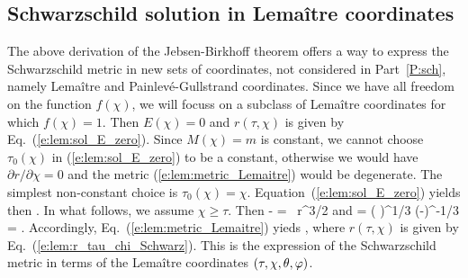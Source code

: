 \subsection{Schwarzschild solution in Lemaître coordinates} \label{s:lem:Schwarzschild}

The above derivation of the Jebsen-Birkhoff theorem offers a way to express
the Schwarzschild metric in new sets of coordinates, not considered in Part~\ref{P:sch},
namely Lemaître and Painlevé-Gullstrand coordinates.
Since we have all freedom on the function $f(\chi)$, we will focuss on a subclass
of Lemaître coordinates for which $f(\chi)=1$.
Then $E(\chi)=0$ and $r(\tau,\chi)$
is given by Eq.~(\ref{e:lem:sol_E_zero}). Since $M(\chi)=m$ is constant, we
cannot choose $\tau_0(\chi)$ in (\ref{e:lem:sol_E_zero}) to be a constant, otherwise we would have
$\partial r/\partial \chi=0$ and the metric
(\ref{e:lem:metric_Lemaitre}) would be degenerate.
The simplest non-constant choice is
$\tau_0(\chi) = \chi$.
Equation~(\ref{e:lem:sol_E_zero}) yields then
\be \label{e:lem:r_tau_chi_Schwarz}
    .
\ee
In what follows, we assume $\chi\geq\tau$. Then
\be \label{e:lem:chi_tau_r_Schwarz}
    \chi - \tau =  \,  r^{3/2}
\ee
and
\be \label{e:lem:drdchi_Schwarz}
     = \left(  \right)^{1/3} (\chi-\tau)^{-1/3}
        =  .
\ee
Accordingly, Eq.~(\ref{e:lem:metric_Lemaitre}) yieds
\be \label{e:lem:Sch_met_Lem}
     ,
\ee
where $r(\tau,\chi)$ is given by Eq.~(\ref{e:lem:r_tau_chi_Schwarz}).
This is the expression of the Schwarzschild metric in terms of the
Lemaître coordinates $(\tau,\chi,\theta,\varphi)$.

